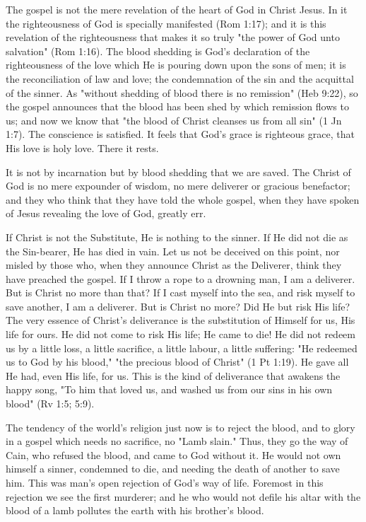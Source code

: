 \documentclass[
]{book}
\begin{document}
The gospel is not the mere revelation of the heart of God in Christ Jesus. In it the righteousness of God is specially manifested (Rom 1:17); and it is this revelation of the righteousness that makes it so truly "the power of God unto salvation" (Rom 1:16). The blood shedding is God's declaration of the righteousness of the love which He is pouring down upon the sons of men; it is the reconciliation of law and love; the condemnation of the sin and the acquittal of the sinner. As "without shedding of blood there is no remission" (Heb 9:22), so the gospel announces that the blood has been shed by which remission flows to us; and now we know that "the blood of Christ cleanses us from all sin" (1 Jn 1:7). The conscience is satisfied. It feels that God's grace is righteous grace, that His love is holy love. There it rests.

It is not by incarnation but by blood shedding that we are saved. The Christ of God is no mere expounder of wisdom, no mere deliverer or gracious benefactor; and they who think that they have told the whole gospel, when they have spoken of Jesus revealing the love of God, greatly err.

If Christ is not the Substitute, He is nothing to the sinner. If He did not die as the Sin-bearer, He has died in vain. Let us not be deceived on this point, nor misled by those who, when they announce Christ as the Deliverer, think they have preached the gospel. If I throw a rope to a drowning man, I am a deliverer. But is Christ no more than that? If I cast myself into the sea, and risk myself to save another, I am a deliverer. But is Christ no more? Did He but risk His life? The very essence of Christ's deliverance is the substitution of Himself for us, His life for ours. He did not come to risk His life; He came to die! He did not redeem us by a little loss, a little sacrifice, a little labour, a little suffering: "He redeemed us to God by his blood," "the precious blood of Christ" (1 Pt 1:19). He gave all He had, even His life, for us. This is the kind of deliverance that awakens the happy song, "To him that loved us, and washed us from our sins in his own blood" (Rv 1:5; 5:9).

The tendency of the world's religion just now is to reject the blood, and to glory in a gospel which needs no sacrifice, no "Lamb slain." Thus, they go the way of Cain, who refused the blood, and came to God without it. He would not own himself a sinner, condemned to die, and needing the death of another to save him. This was man's open rejection of God's way of life. Foremost in this rejection we see the first murderer; and he who would not defile his altar with the blood of a lamb pollutes the earth with his brother's blood.
\end{document}
